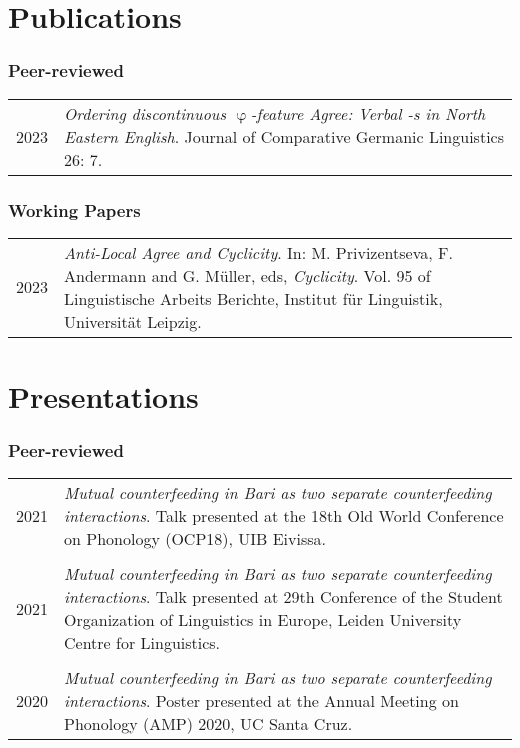\documentclass[11pt]{article}
\begin{document}

\section*{Publications}
\subsubsection*{Peer-reviewed}
\begin{flushleft}
	\begin{tabularx}{\textwidth}{@{}p{}>{\RaggedRight\arraybackslash}p{}@{}}
		2023 & \textit{Ordering discontinuous $\upvarphi$-feature Agree: Verbal -s in North Eastern English}. Journal of Comparative Germanic Linguistics 26: 7. \\
	\end{tabularx}
\end{flushleft}


\subsubsection*{Working Papers}
\begin{flushleft}
	\begin{tabularx}{\textwidth}{@{}p{}>{\RaggedRight\arraybackslash}p{}@{}}
	2023 & \textit{Anti-Local Agree and Cyclicity}. In: M. Privizentseva, F. Andermann and G. Müller, eds, \textit{Cyclicity}. Vol. 95 of Linguistische Arbeits Berichte, Institut für Linguistik, Universität Leipzig. \\
\end{tabularx}
\end{flushleft}

\section*{Presentations}
\subsubsection*{Peer-reviewed}

\begin{flushleft}
	\begin{tabularx}{\textwidth}{@{}p{}>{\RaggedRight\arraybackslash}p{}@{}}
		2021 & \textit{Mutual counterfeeding in Bari as two separate counterfeeding interactions}. Talk presented at the 18th Old World Conference on Phonology (OCP18), UIB Eivissa.\\
		& \\
		2021 &  \textit{Mutual counterfeeding in Bari as two separate
		 counterfeeding interactions}. Talk presented at 29th Conference of the Student Organization of Linguistics in Europe, Leiden University Centre for Linguistics. \\
		 & \\
		 2020 & \textit{Mutual counterfeeding in Bari as two separate counterfeeding interactions}. Poster presented at the Annual Meeting on Phonology (AMP) 2020, UC Santa Cruz.\\
	\end{tabularx}
\end{flushleft}
\end{document}
